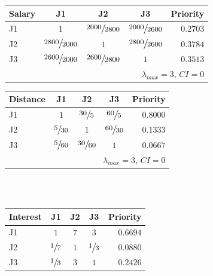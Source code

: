 \begin{table}[h]
    \begin{tabular}{lcccr}
        \hline
        \textbf{Salary} & J1                    & J2                    & J3                    & Priority \\
        \hline
        J1              & $1$                   & ${\large \sfrac{2000}{2800}}$ & ${\large \sfrac{2000}{2600}}$ & $0.2703$ \\
        J2              & ${\large \sfrac{2800}{2000}}$ & $1$                   & ${\large \sfrac{2800}{2600}}$ & $0.3784$ \\
        J3              & ${\large \sfrac{2600}{2000}}$ & ${\large \sfrac{2600}{2800}}$ & $1$                   & $0.3513$ \\        
        \hline
        \multicolumn{5}{r}{$\lambda_{max} = 3$, $CI = 0$}                                                  \\
        \hline
    \end{tabular}
    \hfill
    \begin{tabular}{lcccr}
        \hline
        \textbf{Distance} & J1               & J2                & J3                & Priority \\
        \hline
        J1                & $1$              & ${\large \sfrac{30}{5}}$  & ${\large \sfrac{60}{5}}$  & $0.8000$ \\
        J2                & ${\large \sfrac{5}{30}}$ & $1$               & ${\large \sfrac{60}{30}}$ & $0.1333$ \\
        J3                & ${\large \sfrac{5}{60}}$ & ${\large \sfrac{30}{60}}$ & $1$               & $0.0667$ \\        
        \hline
        \multicolumn{5}{r}{$\lambda_{max} = 3$, $CI = 0$}                                       \\
        \hline
    \end{tabular}
    \\\vspace{1em}\\
    \begin{tabular}{lcccr}
        \hline
        \textbf{Interest} & J1              & J2    & J3              & Priority    \\
        \hline
        J1                & $1$             & $7$   & $3$             & $0.6694$    \\
        J2                & ${\large \sfrac{1}{7}}$ & $1$   & ${\large \sfrac{1}{3}}$ & $0.0880$    \\
        J3                & ${\large \sfrac{1}{3}}$ & $3$   & $1$             & $0.2426$    \\        

\end{tabular}
\end{table}
